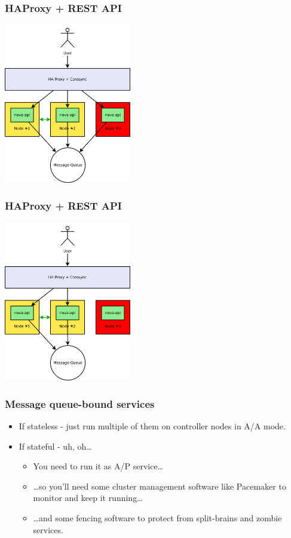 \documentclass[aspectratio=169]{beamer}
\begin{document}
\begin{frame}
    \frametitle{HAProxy + REST API}
    \begin{center}
        \includegraphics[height=7cm]{images/haproxy2.png}
    \end{center}
\end{frame}

\begin{frame}
    \frametitle{HAProxy + REST API}
    \begin{center}
        \includegraphics[height=7cm]{images/haproxy3.png}
    \end{center}
\end{frame}

\begin{frame}
    \frametitle{Message queue-bound services}
    \begin{itemize}
        \item If stateless - just run multiple of them on controller nodes in A/A mode.
        \pause
        \item If stateful - uh, oh…
        \pause
        \begin{itemize}
            \item You need to run it as A/P service…
            \pause
            \item …so you'll need some cluster management software like Pacemaker to monitor and keep it running…
            \pause
            \item …and some fencing software to protect from split-brains and zombie services.
        \end{itemize}
    \end{itemize}
\end{frame}
\end{document}
